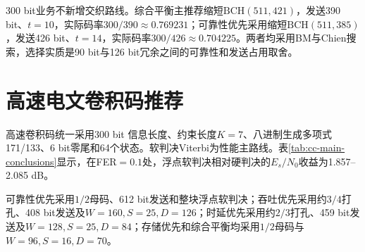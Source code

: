 300 bit业务不新增交织路线。综合平衡主推荐缩短$\mathrm{BCH}(511,421)$，发送390 bit、$t=10$，实际码率$300/390\approx0.769231$；可靠性优先采用缩短$\mathrm{BCH}(511,385)$，发送426 bit、$t=14$，实际码率$300/426\approx0.704225$。两者均采用BM与Chien搜索，选择实质是90 bit与126 bit冗余之间的可靠性和发送占用取舍。

\begin{table}[htbp]
  \centering\scriptsize
  \caption{低速BCH最终推荐矩阵}
  \label{tab:final-bch-matrix}
\end{table}

\section{高速电文卷积码推荐}

高速卷积码统一采用300 bit 信息长度、约束长度$K=7$、八进制生成多项式171/133、6 bit零尾和64个状态。软判决Viterbi为性能主路线。表\ref{tab:cc-main-conclusions}显示，在FER$=0.1$处，浮点软判决相对硬判决的$E_s/N_0$收益为1.857--2.085 dB。

可靠性优先采用$1/2$母码、612 bit发送和整块浮点软判决；吞吐优先采用约$3/4$打孔、408 bit发送及$W=160,S=25,D=126$；时延优先采用约$2/3$打孔、459 bit发送及$W=128,S=25,D=84$；存储优先和综合平衡均采用$1/2$母码与$W=96,S=16,D=70$。

